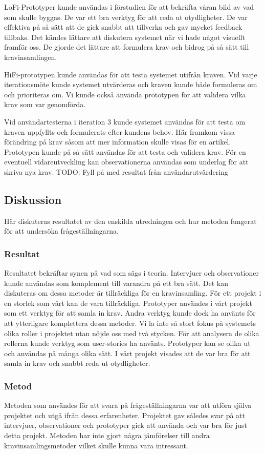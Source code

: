 LoFi-Prototyper kunde användas i förstudien för att bekräfta våran bild av vad som skulle byggas. De var ett bra verktyg för att reda ut otydligheter. De var effektiva på så sätt att de gick snabbt att tillverka och gav mycket feedback tillbaks. Det kändes lättare att diskutera systemet när vi hade något visuellt framför oss. De gjorde det lättare att formulera krav och bidrog på så sätt till kravinsamlingen.

HiFi-prototypen kunde användas för att testa systemet utifrån kraven. Vid varje iterationsmöte kunde systemet utvärderas och kraven kunde både formuleras om och prioriteras om. Vi kunde också använda prototypen för att validera vilka krav som var genomförda. 
 
Vid användartesterna i iteration 3 kunde systemet användas för att testa om kraven uppfyllts och formulerats efter kundens behov. Här framkom vissa förändring på krav såsom att mer information skulle visas för en artikel. Prototypen kunde på så sätt användas för att testa och validera krav. För en eventuell vidareutveckling kan observationerna användas som underlag för att skriva nya krav.
TODO: Fyll på med resultat från användarutvärdering

\subsection{Diskussion}
Här diskuteras resultatet av den enskilda utredningen och hur metoden fungerat för att undersöka frågeställningarna.
\subsubsection{Resultat}
Resultatet bekräftar synen på vad som sägs i teorin. Intervjuer och observationer kunde användas som komplement till varandra på ett bra sätt. Det kan diskuteras om dessa metoder är tillräckliga för en kravinsamling. För ett projekt i en storlek som vårt kan de vara tillräckliga. Prototyper användes i vårt projekt som ett verktyg för att samla in krav. Andra verktyg kunde dock ha använts för att ytterligare komplettera dessa metoder. Vi la inte så stort fokus på systemets olika roller i projektet utan nöjde oss med två stycken. För att analysera de olika rollerna kunde verktyg som user-stories ha använts.
Prototyper kan se olika ut och användas på många olika sätt. I vårt projekt visades att de var bra för att samla in krav och snabbt reda ut otydligheter. 
\subsubsection{Metod}
Metoden som användes för att svara på frågeställningarna var att utföra själva projektet och utgå ifrån dessa erfarenheter. Projektet gav således svar på att intervjuer, observationer och prototyper gick att använda och var bra för just detta projekt. Metoden har inte gjort några jämförelser till andra kravinsamlingsmetoder vilket skulle kunna vara intressant. 

